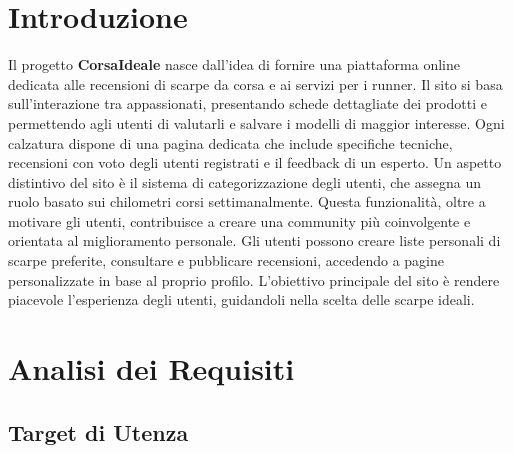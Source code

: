 \documentclass[a4paper, 12pt]{article}
\begin{document}
\newpage
\begin{justify}
    

\section{Introduzione}
Il progetto \textbf{CorsaIdeale} nasce dall'idea di fornire una piattaforma online dedicata alle recensioni di scarpe da corsa e ai servizi per i runner. Il sito si basa sull'interazione tra appassionati, presentando schede dettagliate dei prodotti e permettendo agli utenti di valutarli e salvare i modelli di maggior interesse. Ogni calzatura dispone di una pagina dedicata che include specifiche tecniche, recensioni con voto degli utenti registrati e il feedback di un esperto. Un aspetto distintivo del sito è il sistema di categorizzazione degli utenti, che assegna un ruolo basato sui chilometri corsi settimanalmente. Questa funzionalità, oltre a motivare gli utenti, contribuisce a creare una community più coinvolgente e orientata al miglioramento personale. Gli utenti possono creare liste personali di scarpe preferite, consultare e pubblicare recensioni, accedendo a pagine personalizzate in base al proprio profilo. L'obiettivo principale del sito è rendere piacevole l'esperienza degli utenti, guidandoli nella scelta delle scarpe ideali.


\section{Analisi dei Requisiti}

\subsection{Target di Utenza}


\end{justify}
\end{document}
